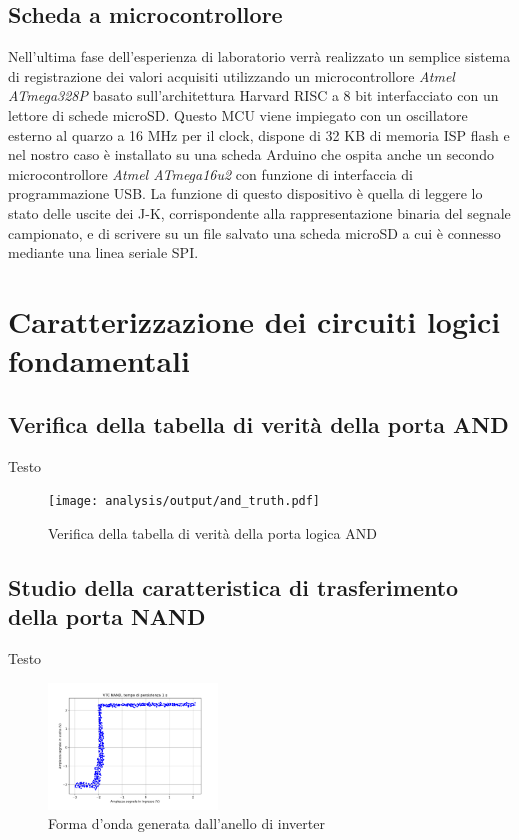 \documentclass[journal]{IEEEtran}
\begin{document}
\subsection{Scheda a microcontrollore}
Nell'ultima fase dell'esperienza di laboratorio verrà realizzato un semplice sistema di registrazione dei valori acquisiti utilizzando un microcontrollore \textit{Atmel ATmega328P} basato sull'architettura Harvard RISC a 8 bit interfacciato con un lettore di schede microSD. Questo MCU viene impiegato con un oscillatore esterno al quarzo a 16 MHz per il clock, dispone di 32 KB di memoria ISP flash e nel nostro caso è installato su una scheda Arduino che ospita anche un secondo microcontrollore \textit{Atmel ATmega16u2} con funzione di interfaccia di programmazione USB. La funzione di questo dispositivo è quella di leggere lo stato delle uscite dei J-K, corrispondente alla rappresentazione binaria del segnale campionato, e di scrivere su un file salvato una scheda microSD a cui è connesso mediante una linea seriale SPI.


\section{Caratterizzazione dei circuiti logici fondamentali}

\subsection{Verifica della tabella di verità della porta AND}
Testo

\begin{figure}[H]%
\begin{center}
\texttt{[image: analysis/output/and\_truth.pdf]}
\caption{Verifica della tabella di verità della porta logica AND}
\label{fig:graph_ring_oscillator}
\end{center}
\end{figure}



\subsection{Studio della caratteristica di trasferimento della porta NAND}
Testo

\begin{figure}[H]%
\begin{center}
\includegraphics[width=0.40\textwidth]{analysis/output/NAND-XY.pdf}
\caption{Forma d'onda generata dall'anello di inverter}
\label{fig:graph_ring_oscillator}
\end{center}
\end{figure}
\end{document}
